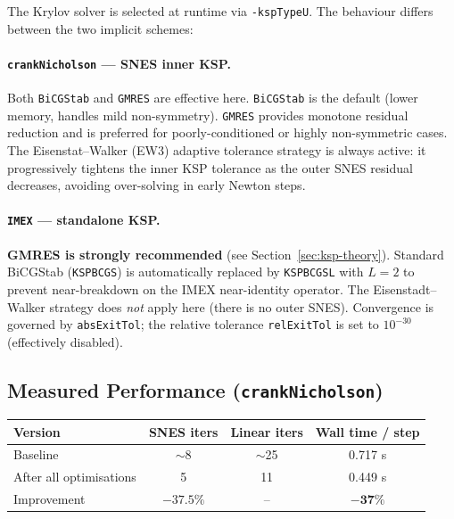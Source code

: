 \documentclass[12pt,a4paper]{article}
\begin{document}
	The Krylov solver is selected at runtime via \texttt{-kspTypeU}.
	The behaviour differs between the two implicit schemes:

	\paragraph{\texttt{crankNicholson} --- SNES inner KSP.}
	Both \texttt{BiCGStab} and \texttt{GMRES} are effective here.
	\texttt{BiCGStab} is the default (lower memory, handles mild non-symmetry).
	\texttt{GMRES} provides monotone residual reduction and is preferred for
	poorly-conditioned or highly non-symmetric cases.
	The Eisenstat--Walker (EW3) adaptive tolerance strategy is always active:
	it progressively tightens the inner KSP tolerance as the outer SNES
	residual decreases, avoiding over-solving in early Newton steps.

	\paragraph{\texttt{IMEX} --- standalone KSP.}
	\textbf{GMRES is strongly recommended} (see Section~\ref{sec:ksp-theory}).
	Standard BiCGStab (\texttt{KSPBCGS}) is automatically replaced by
	\texttt{KSPBCGSL} with $L=2$ to prevent near-breakdown on the IMEX
	near-identity operator.
	The Eisenstadt--Walker strategy does \emph{not} apply here (there is no
	outer SNES).
	Convergence is governed by \texttt{absExitTol}; the relative tolerance
	\texttt{relExitTol} is set to $10^{-30}$ (effectively disabled).
	
	\subsection{Measured Performance (\texttt{crankNicholson})}
	
	\begin{center}
		\begin{tabular}{lccc}
			\toprule
			Version & SNES iters & Linear iters & Wall time / step \\
			\midrule
			Baseline & $\sim$8 & $\sim$25 & 0.717 s \\
			After all optimisations & 5 & 11 & 0.449 s \\
			\midrule
			Improvement & $\mathbf{-37.5\%}$ & -- & $\mathbf{-37\%}$ \\
			\bottomrule
		\end{tabular}
	\end{center}
	
\end{document}
